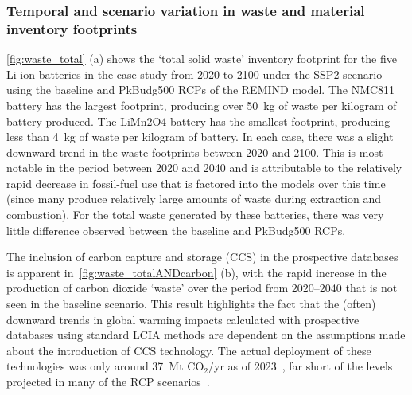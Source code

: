 


\subsubsection{Temporal and scenario variation in waste and material inventory footprints}

\autoref{fig:waste_total} (a) shows the `total solid waste' inventory footprint for the five Li-ion batteries in the case study from 2020 to 2100 under the SSP2 scenario using the baseline and PkBudg500 RCPs of the REMIND model. The NMC811 battery has the largest footprint, producing over 50~kg of waste per kilogram of battery produced. The LiMn2O4 battery has the smallest footprint, producing less than 4~kg of waste per kilogram of battery. In each case, there was a slight downward trend in the waste footprints between 2020 and 2100. This is most notable in the period between 2020 and 2040 and is attributable to the relatively rapid decrease in fossil-fuel use that is factored into the models over this time (since many produce relatively large amounts of waste during extraction and combustion). For the total waste generated by these batteries, there was very little difference observed between the baseline and PkBudg500 RCPs.

The inclusion of carbon capture and storage (CCS) in the prospective databases is apparent in~\autoref{fig:waste_totalANDcarbon} (b), with the rapid increase in the production of carbon dioxide `waste' over the period from 2020--2040 that is not seen in the baseline scenario. This result highlights the fact that the (often) downward trends in global warming impacts calculated with prospective databases using standard LCIA methods are dependent on the assumptions made about the introduction of CCS technology. The actual deployment of these technologies was only around 37~Mt CO$_2$/yr as of 2023~\citep{dziejarski2023ccs}, far short of the levels projected in many of the RCP scenarios~\citep{sacchi2023premisedocs}.

